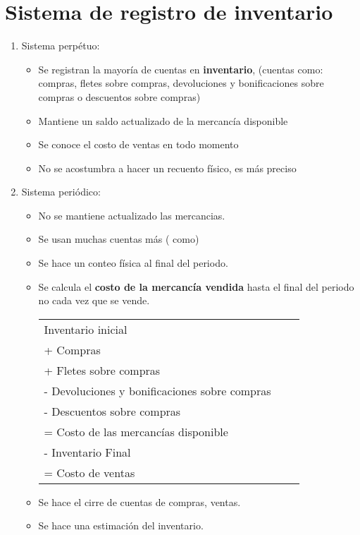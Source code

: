 \documentclass{article}
\begin{document}
\section{Sistema de registro de inventario}
\begin{enumerate}
    \item Sistema perpétuo:
    \begin{itemize}
        \item Se registran la mayoría de cuentas en \textbf{inventario}, (cuentas como: compras, fletes sobre compras, devoluciones y bonificaciones sobre compras o descuentos sobre compras)
        \item Mantiene un saldo actualizado de la mercancía disponible
        \item Se conoce el costo de ventas en todo momento
        \item No se acostumbra a hacer un recuento físico, es más preciso
    \end{itemize}
    \item Sistema periódico:
    \begin{itemize}
        \item No se mantiene actualizado las mercancias.
        \item Se usan muchas cuentas más ( como)
        \item Se hace un conteo física al final del periodo.
        \item Se calcula el \textbf{costo de la mercancía vendida} hasta el final del periodo no cada vez que se vende. \newline 
        \begin{center}
            \begin{tabular}{ | p{5cm} | p{5cm} | p{5cm} | }
                \hline
               Inventario inicial  \\ 
               + Compras  \\ 
               + Fletes sobre compras \\ 
               - Devoluciones y bonificaciones sobre compras \\ 
               - Descuentos sobre compras \\ 
               = Costo de las mercancías disponible \\ 
               - Inventario Final \\ 
               = Costo de ventas \\  
                \hline
               \end{tabular} 
        \end{center}

        \item Se hace el cirre de cuentas de compras, ventas.
        \item Se hace una estimación del inventario.
    \end{itemize}
\end{enumerate}
\end{document}
